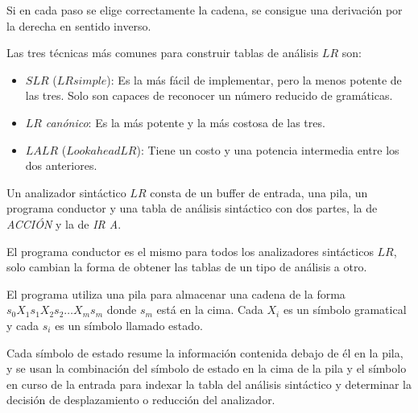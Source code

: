 Si en cada paso se elige correctamente la cadena, se consigue una derivación por la derecha en sentido inverso.


Las tres técnicas más comunes para construir tablas de análisis $LR$ son:
\begin{itemize}

\item $SLR$ ($LR simple$): Es la más fácil de implementar, pero la menos potente de las tres. Solo son capaces de reconocer un número reducido de gramáticas.

\item $LR$ \textit{canónico}: Es la más potente y la más costosa de las tres.

\item $LALR$ ($Lookahead LR$): Tiene un costo y una potencia intermedia entre los dos anteriores.

\end{itemize}



Un analizador sintáctico $LR$  consta de un buffer de  entrada, una pila, un programa conductor y una tabla de análisis sintáctico con dos partes, la de \textit{ACCIÓN} y la de \textit{IR A}. 

El programa conductor es el mismo para todos los analizadores sintácticos $LR$, solo cambian la forma de obtener las tablas de un tipo de análisis a otro.

El programa utiliza una pila para almacenar una cadena de la forma $s_{0}X_{1}s_{1}X_{2}s_{2}\ldots X_{m}s_{m} $ donde $s_{m}$ está en la cima. Cada $X_{i}$ es un símbolo gramatical y cada $s_{i}$ es un símbolo llamado estado.

Cada símbolo de estado resume la información contenida debajo de él en la pila, y se usan la combinación del símbolo de estado en la cima de la pila y el símbolo en curso de la entrada para indexar la tabla del análisis sintáctico y determinar la decisión de desplazamiento o reducción del analizador. 

